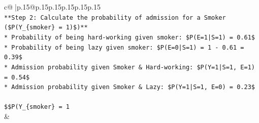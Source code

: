 \documentclass{article}
\begin{document}
{\begin{supertabular}{c@{$\;$}|p{.15\linewidth}@{}p{.15\linewidth}p{.15\linewidth}p{.15\linewidth}p{.15\linewidth}p{.15\linewidth}}
{{{\\ 
\texttt{**Step 2: Calculate the probability of admission for a Smoker (\$P(Y\_\{smoker\} = 1)\$)**} \\
\texttt{*   Probability of being hard{-}working given smoker: \$P(E=1|S=1) = 0.61\$} \\
\texttt{*   Probability of being lazy given smoker: \$P(E=0|S=1) = 1 {-} 0.61 = 0.39\$} \\
\texttt{*   Admission probability given Smoker \& Hard{-}working: \$P(Y=1|S=1, E=1) = 0.54\$} \\
\texttt{*   Admission probability given Smoker \& Lazy: \$P(Y=1|S=1, E=0) = 0.23\$} \\
\\ 
\texttt{\$\$P(Y\_\{smoker\} = 1} \\
            }
        }
    }
    & \\ \\


\end{supertabular}}
\end{document}
